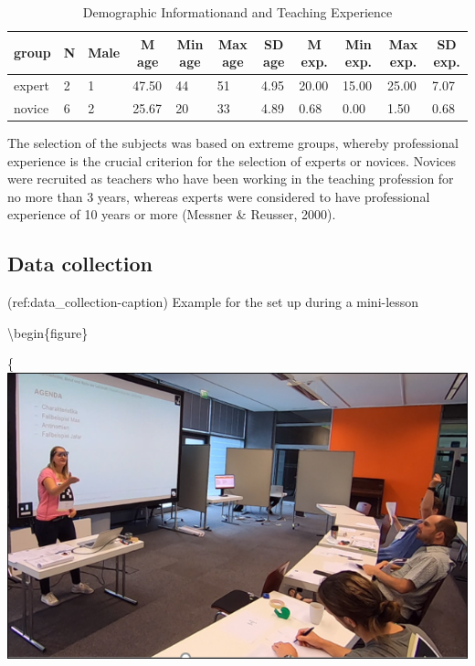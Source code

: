 \documentclass[
  english,
  man,floatsintext]{apa6}
\begin{document}
\begin{table}[h]

\begin{center}
\begin{threeparttable}

\caption{\label{tab:demographicspilottable}Demographic Informationand and Teaching Experience}

\small{

\begin{tabular}{lllllllllll}
\toprule
group & \multicolumn{1}{c}{N} & \multicolumn{1}{c}{Male} & \multicolumn{1}{c}{M age} & \multicolumn{1}{c}{Min age} & \multicolumn{1}{c}{Max age} & \multicolumn{1}{c}{SD age} & \multicolumn{1}{c}{M exp.} & \multicolumn{1}{c}{Min exp.} & \multicolumn{1}{c}{Max exp.} & \multicolumn{1}{c}{SD exp.}\\
\midrule
expert & 2 & 1 & 47.50 & 44 & 51 & 4.95 & 20.00 & 15.00 & 25.00 & 7.07\\
novice & 6 & 2 & 25.67 & 20 & 33 & 4.89 & 0.68 & 0.00 & 1.50 & 0.68\\
\bottomrule
\end{tabular}

}

\end{threeparttable}
\end{center}

\end{table}

The selection of the subjects was based on extreme groups, whereby professional experience is the crucial criterion for the selection of experts or novices. Novices were recruited as teachers who have been working in the teaching profession for no more than 3 years, whereas experts were considered to have professional experience of 10 years or more (Messner \& Reusser, 2000).

\hypertarget{data-collection}{%
\subsection{Data collection}\label{data-collection}}

(ref:data\_collection-caption) Example for the set up during a mini-lesson

\textbackslash begin\{figure\}

\{\centering \includegraphics{./pictures/data_collection}
\end{document}
